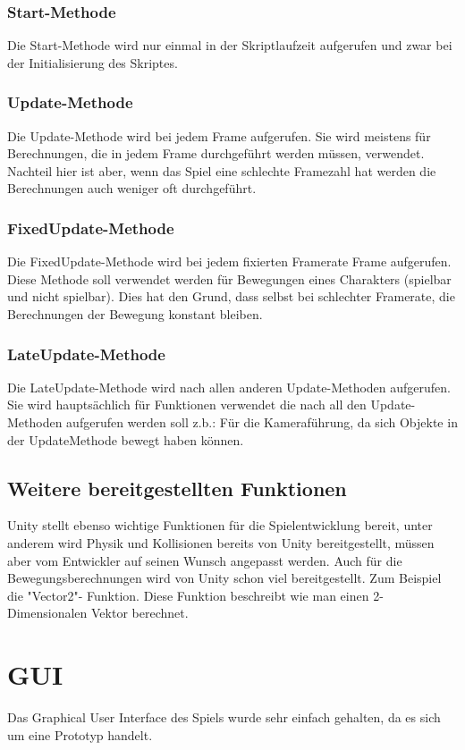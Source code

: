 \subsubsection{Start-Methode}
Die Start-Methode wird nur einmal in der Skriptlaufzeit aufgerufen und zwar bei der Initialisierung des Skriptes.
\subsubsection{Update-Methode}
Die Update-Methode wird bei jedem Frame aufgerufen. Sie wird meistens für Berechnungen, die in jedem Frame durchgeführt werden müssen, verwendet. Nachteil hier ist aber, wenn das Spiel eine schlechte Framezahl hat werden die Berechnungen auch weniger oft durchgeführt.
\subsubsection{FixedUpdate-Methode}
Die FixedUpdate-Methode wird bei jedem fixierten Framerate Frame aufgerufen. Diese Methode soll verwendet werden für Bewegungen eines Charakters (spielbar und nicht spielbar). Dies hat den Grund, dass selbst bei schlechter Framerate, die Berechnungen der Bewegung konstant bleiben.
\subsubsection{LateUpdate-Methode}
Die LateUpdate-Methode wird nach allen anderen Update-Methoden aufgerufen. Sie wird hauptsächlich für Funktionen verwendet die nach all den Update-Methoden aufgerufen werden soll z.b.: Für die Kameraführung, da sich Objekte in der UpdateMethode bewegt haben können.
\subsection{Weitere bereitgestellten Funktionen}
Unity stellt ebenso wichtige Funktionen für die Spielentwicklung bereit, unter anderem wird Physik und Kollisionen bereits von Unity bereitgestellt, müssen aber vom Entwickler auf seinen Wunsch angepasst werden. Auch für die Bewegungsberechnungen wird von Unity schon viel bereitgestellt. Zum Beispiel die "Vector2"- Funktion. Diese Funktion beschreibt wie man einen 2-Dimensionalen Vektor berechnet. 

\section{GUI}
\def \currentAuthor {Lukas Vogel}
Das Graphical User Interface des Spiels wurde sehr einfach gehalten, da es sich um eine Prototyp handelt.
